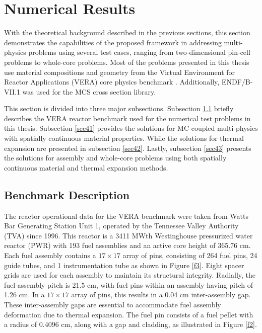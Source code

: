 \newpage 
\section{Numerical Results} \label{s4}
With the theoretical background described in the previous sections, this section demonstrates the capabilities of the proposed framework in addressing multi-physics problems using several test cases, ranging from two-dimensional pin-cell problems to whole-core problems. Most of the problems presented in this thesis use material compositions and geometry from the Virtual Environment for Reactor Applications (VERA) core physics benchmark \cite{godfrey}. Additionally, ENDF/B-VII.1 was used for the MCS cross section library.

This section is divided into three major subsections. Subsection \ref{sec40} briefly describes the VERA reactor benchmark used for the numerical test problems in this thesis. Subsection \ref{sec41} provides the solutions for MC coupled multi-physics with spatially continuous material properties. While the solutions for thermal expansion are presented in subsection \ref{sec42}. Lastly, subsection \ref{sec43} presents the solutions for assembly and whole-core problems using both spatially continuous material and thermal expansion methods.

\subsection{Benchmark Description} \label{sec40}

The reactor operational data for the VERA benchmark were taken from Watts Bar Generating Station Unit 1, operated by the Tennessee Valley Authority (TVA) since 1996. This reactor is a 3411 MWth Westinghouse pressurized water reactor (PWR) with 193 fuel assemblies and an active core height of 365.76 cm. Each fuel assembly contains a \(17 \times 17\) array of pins, consisting of 264 fuel pins, 24 guide tubes, and 1 instrumentation tube as shown in Figure \ref{f3}. Eight spacer grids are used for each assembly to maintain its structural integrity. Radially, the fuel-assembly pitch is 21.5 cm, with fuel pins within an assembly having pitch of 1.26 cm. In a \(17 \times 17\) array of pins, this results in a 0.04 cm inter-assembly gap. These inter-assembly gaps are essential to accommodate fuel assembly deformation due to thermal expansion. The fuel pin consists of a fuel pellet with a radius of 0.4096 cm, along with a gap and cladding, as illustrated in Figure \ref{f2}.

